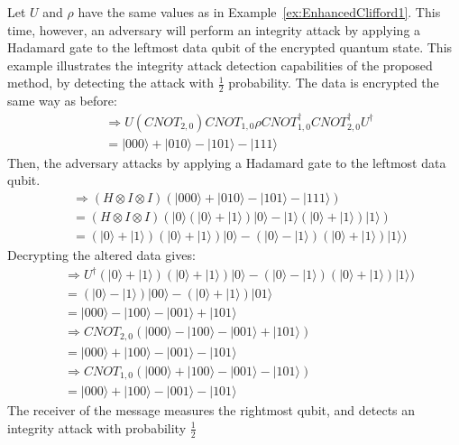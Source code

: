 \begin{example}
\label{ex:IntegrityAttackEnhancedClifford2}
	Let $U$ and $\rho$ have the same values as in Example~\ref{ex:EnhancedClifford1}. This time, however, an adversary will perform an integrity attack by applying a Hadamard gate to the leftmost data qubit of the encrypted quantum state. This example illustrates the integrity attack detection capabilities of the proposed method, by detecting the attack with $\frac{1}{2}$ probability. The data is encrypted the same way as before:
	\begin{align}
	& \Rightarrow U (\mathit{CNOT}_{2,0})\mathit{CNOT}_{1,0}\rho \mathit{CNOT}_{1,0}^{\dagger}\mathit{CNOT}_{2,0}^{\dagger} U^{\dagger}\\
	&= |000\rangle + |010\rangle - |101\rangle - |111\rangle
	\end{align}
	Then, the adversary attacks by applying a Hadamard gate to the leftmost data qubit.
	\begin{align}
	& \Rightarrow (H \otimes I \otimes I)(|000\rangle + |010\rangle - |101\rangle - |111\rangle)\\
	&= (H \otimes I \otimes I)(|0\rangle(|0\rangle + |1\rangle)|0\rangle - |1\rangle(|0\rangle + |1\rangle)|1\rangle)\\
	&= (|0\rangle+|1\rangle)(|0\rangle + |1\rangle)|0\rangle - (|0\rangle-|1\rangle)(|0\rangle + |1\rangle)|1\rangle)
	\end{align}
	Decrypting the altered data gives:
	\begin{align}
	& \Rightarrow U^{\dagger}(|0\rangle+|1\rangle)(|0\rangle + |1\rangle)|0\rangle - (|0\rangle-|1\rangle)(|0\rangle + |1\rangle)|1\rangle)\\
	&= (|0\rangle-|1\rangle)|00\rangle - (|0\rangle+|1\rangle)|01\rangle\\
    &= |000\rangle-|100\rangle - |001\rangle+|101\rangle\\
	& \Rightarrow \mathit{CNOT}_{2,0} (|000\rangle-|100\rangle - |001\rangle+|101\rangle)\\
	&= |000\rangle+|100\rangle - |001\rangle-|101\rangle\\
	& \Rightarrow \mathit{CNOT}_{1,0} (|000\rangle+|100\rangle - |001\rangle-|101\rangle)\\
	&= |000\rangle+|100\rangle - |001\rangle-|101\rangle
	\end{align}
The receiver of the message measures the rightmost qubit, and detects an integrity attack with probability $\frac{1}{2}$
\end{example}
